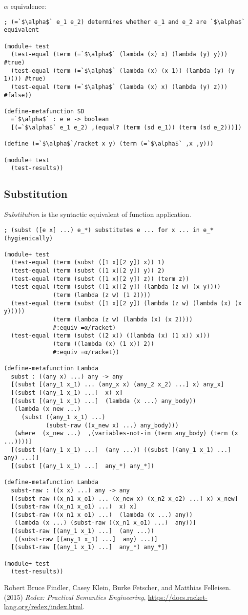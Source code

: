 $\alpha$ equivalence:

\begin{lstlisting}[frame=none,numbers=none]
; (=`$\alpha$` e_1 e_2) determines whether e_1 and e_2 are `$\alpha$` equivalent

(module+ test
  (test-equal (term (=`$\alpha$` (lambda (x) x) (lambda (y) y))) #true)
  (test-equal (term (=`$\alpha$` (lambda (x) (x 1)) (lambda (y) (y 1)))) #true)
  (test-equal (term (=`$\alpha$` (lambda (x) x) (lambda (y) z))) #false))

(define-metafunction SD
  =`$\alpha$` : e e -> boolean
  [(=`$\alpha$` e_1 e_2) ,(equal? (term (sd e_1)) (term (sd e_2)))])

(define (=`$\alpha$`/racket x y) (term (=`$\alpha$` ,x ,y)))

(module+ test
  (test-results))
\end{lstlisting}

\subsection{Substitution}

\textit{Substitution} is the syntactic equivalent of function application.

\begin{lstlisting}[frame=none,numbers=none]
; (subst ([e x] ...) e_*) substitutes e ... for x ... in e_* (hygienically)

(module+ test
  (test-equal (term (subst ([1 x][2 y]) x)) 1)
  (test-equal (term (subst ([1 x][2 y]) y)) 2)
  (test-equal (term (subst ([1 x][2 y]) z)) (term z))
  (test-equal (term (subst ([1 x][2 y]) (lambda (z w) (x y))))
              (term (lambda (z w) (1 2))))
  (test-equal (term (subst ([1 x][2 y]) (lambda (z w) (lambda (x) (x y)))))
              (term (lambda (z w) (lambda (x) (x 2))))
              #:equiv =α/racket)
  (test-equal (term (subst ((2 x)) ((lambda (x) (1 x)) x)))
              (term ((lambda (x) (1 x)) 2))
              #:equiv =α/racket))

(define-metafunction Lambda
  subst : ((any x) ...) any -> any
  [(subst [(any_1 x_1) ... (any_x x) (any_2 x_2) ...] x) any_x]
  [(subst [(any_1 x_1) ...]  x) x]
  [(subst [(any_1 x_1) ...]  (lambda (x ...) any_body))
   (lambda (x_new ...)
     (subst ((any_1 x_1) ...)
            (subst-raw ((x_new x) ...) any_body)))
   (where  (x_new ...)  ,(variables-not-in (term any_body) (term (x ...))))]
  [(subst [(any_1 x_1) ...]  (any ...)) ((subst [(any_1 x_1) ...]  any) ...)]
  [(subst [(any_1 x_1) ...]  any_*) any_*])

(define-metafunction Lambda
  subst-raw : ((x x) ...) any -> any
  [(subst-raw ((x_n1 x_o1) ... (x_new x) (x_n2 x_o2) ...) x) x_new]
  [(subst-raw ((x_n1 x_o1) ...)  x) x]
  [(subst-raw ((x_n1 x_o1) ...)  (lambda (x ...) any))
   (lambda (x ...) (subst-raw ((x_n1 x_o1) ...)  any))]
  [(subst-raw [(any_1 x_1) ...]  (any ...))
   ((subst-raw [(any_1 x_1) ...]  any) ...)]
  [(subst-raw [(any_1 x_1) ...]  any_*) any_*])

(module+ test
  (test-results))
\end{lstlisting}

\begin{thebibliography}{9}
Robert Bruce Findler, Casey Klein, Burke Fetscher, and Matthias Felleisen.
(2015) \emph{Redex: Practical Semantics Engineering},
\url{https://docs.racket-lang.org/redex/index.html}.
\end{thebibliography}
